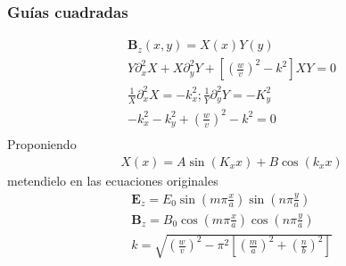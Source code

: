 \subsubsection{Guías cuadradas}
\begin{eqnarray}
	\mathbf{B}_{z}(x,y)=X(x)Y(y) \nonumber \\
	Y \partial_{x}^2 X+X \partial_{y}^2Y + [(\frac{w}{v})^2-k^2]XY=0 \nonumber \\
	\frac{1}{X} \partial_{x}^2 X=-k_{x}^2 ; \frac{1}{Y}\partial_{y}^2 Y = -K_{y}^2 \nonumber \\
	-k_{x}^2 - k_{y}^2+(\frac{w}{v})^2 - k^2 = 0 \nonumber\\
		\end{eqnarray}
	Proponiendo  
		\begin{eqnarray}
	X(x)=A \sin (K_{x} x) + B \cos(k_{x}x)  
\end{eqnarray}
	metendielo en las ecuaciones originales
	\begin{eqnarray}
		\mathbf{E}_{z}=E_{0} \sin(m \pi \frac{x}{a}) \sin(n \pi \frac{y}{a}) \\
	\mathbf{B}_{z}=B_{0} \cos(m \pi \frac{x}{a}) \cos(n \pi \frac{y}{a}) \\
	k = \sqrt{(\frac{w}{v})^2-\pi^2 [(\frac{m}{a})^2+(\frac{n}{b})^2]} 
\end{eqnarray}
